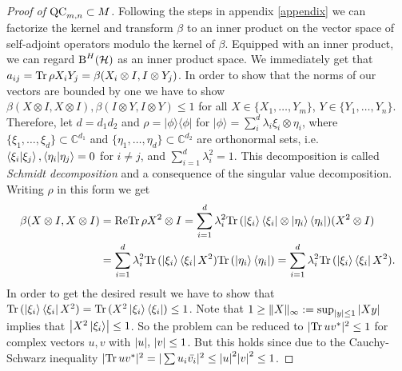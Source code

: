 \begin{proof}[Proof of $ \textup{QC}_{m,n} \subset M $]
	Following the steps in appendix \ref{appendix} we can factorize the kernel and transform $ \beta $ to an inner product on the vector space of self-adjoint operators modulo the kernel of $ \beta $. 
	Equipped with an inner product, we can regard $ \textup{B}^{H}(\mathcal{H}) $ as an inner product space. 
	We immediately get that $ a_{ij} =\text{Tr} \, {\rho X_i Y_j} =  \beta(X_i \otimes I,I \otimes Y_j) $. In order to show that the norms of our vectors are bounded by one we have to show
	$ \beta(X \otimes I, X \otimes I), \beta(I \otimes Y, I \otimes Y) \le 1$ for all $ X \in \{X_1,\hdots,Y_m \} $, $ Y \in \{Y_1,\hdots,Y_n \} $. 
	Therefore, let $ d = d_1d_2 $ and $ \rho = \vert \phi \rangle \langle \phi \vert $ for $ \vert \phi \rangle = \sum_{i}^{d}\lambda_i \xi_i \otimes \eta_i $, where $ \{ \xi_1,\hdots,\xi_d \} \subset \mathbb{C}^{d_1}$ and $ \{  \eta_1,\hdots,\eta_d\} \subset \mathbb{C}^{d_2}$ are orthonormal sets, i.e. $ \braket{\xi_i \vert \xi_j}, \braket{\eta_i \vert \eta_j} = 0 $ for $ i \neq j $, and $ \sum_{i=1}^d \lambda_i^2 = 1 $. This decomposition is called {\itshape Schmidt decomposition} and a consequence of the singular value decomposition. Writing $ \rho $ in this form we get 
	\begin{align*}
		\beta(X \otimes I, X \otimes I) &= \textup{Re} \text{Tr} \, {\rho X^2 \otimes I} =  \sum_{i=1}^d \lambda_i^2 \text{Tr} \, {(\ket{\xi_i} \bra{\xi_i} \otimes \ket{\eta_i}\bra{\eta_i})(X^2 \otimes I) }  \\
		&= \sum_{i=1}^{d}\lambda_i^2 \text{Tr} \, {(\ket{\xi_i} \bra{\xi_i}X^2)} \text{Tr} \, {(\ket{\eta_i}\bra{\eta_i})}  =  \sum_{i=1}^{d}\lambda_i^2 \text{Tr} \, {(\ket{\xi_i} \bra{\xi_i}X^2)} .
	\end{align*}
	In order to get the desired result we have to show that $ \text{Tr} \, {(\ket{\xi_i} \bra{\xi_i}X^2)}  = \text{Tr} \, {(X^2\ket{\xi_i} \bra{\xi_i})}  \le 1 $. 
	Note that $1 \ge  \Vert {X} \Vert_{\infty} := \sup_{{\left|{y}\right|}\le 1} {\left|{Xy}\right|} $ implies that $ {\left|{X^2\ket{\xi_i}}\right|} \le 1 $. So the problem can be reduced to $ \vert \text{Tr} \, {uv^*} \vert^2 \le 1 $ for complex vectors $ u,v $ with $ {\left|{u}\right|},\, {\left|{v}\right|} \le 1 $. But this holds since due to the Cauchy-Schwarz inequality 
	$ \vert\text{Tr} \, {uv^*} \vert^2 = \vert\sum u_i \bar{v_i}\vert^2 \le {\left|{u}\right|}^2{\left|{v}\right|}^2 \le 1 $.
	

\end{proof}
